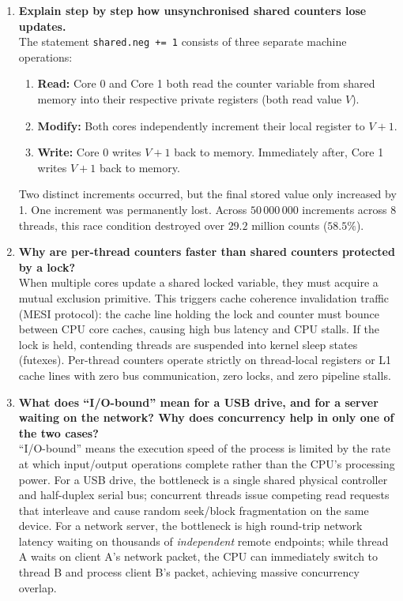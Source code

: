 \documentclass{labreport}
\begin{document}
\begin{enumerate}
    \item \textbf{Explain step by step how unsynchronised shared counters lose updates.}\\
    The statement \texttt{shared.neg += 1} consists of three separate machine operations:
    \begin{enumerate}
        \item \textbf{Read:} Core 0 and Core 1 both read the counter variable from shared memory into their respective private registers (both read value $V$).
        \item \textbf{Modify:} Both cores independently increment their local register to $V + 1$.
        \item \textbf{Write:} Core 0 writes $V + 1$ back to memory. Immediately after, Core 1 writes $V + 1$ back to memory.
    \end{enumerate}
    Two distinct increments occurred, but the final stored value only increased by 1. One increment was permanently lost. Across $50\,000\,000$ increments across 8 threads, this race condition destroyed over $29.2\text{ million}$ counts ($58.5\%$).

    \item \textbf{Why are per-thread counters faster than shared counters protected by a lock?}\\
    When multiple cores update a shared locked variable, they must acquire a mutual exclusion primitive. This triggers cache coherence invalidation traffic (MESI protocol): the cache line holding the lock and counter must bounce between CPU core caches, causing high bus latency and CPU stalls. If the lock is held, contending threads are suspended into kernel sleep states (futexes). Per-thread counters operate strictly on thread-local registers or L1 cache lines with zero bus communication, zero locks, and zero pipeline stalls.

    \item \textbf{What does ``I/O-bound'' mean for a USB drive, and for a server waiting on the network? Why does concurrency help in only one of the two cases?}\\
    ``I/O-bound'' means the execution speed of the process is limited by the rate at which input/output operations complete rather than the CPU's processing power. For a USB drive, the bottleneck is a single shared physical controller and half-duplex serial bus; concurrent threads issue competing read requests that interleave and cause random seek/block fragmentation on the same device. For a network server, the bottleneck is high round-trip network latency waiting on thousands of \textit{independent} remote endpoints; while thread A waits on client A's network packet, the CPU can immediately switch to thread B and process client B's packet, achieving massive concurrency overlap.


\end{enumerate}
\end{document}
